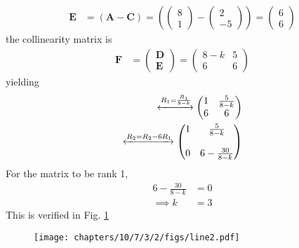 \documentclass[journal,10pt,twocolumn]{article}
\newcommand{\myvec}[1]{\ensuremath{\begin{pmatrix}#1\end{pmatrix}}}
\let\vec\mathbf
\providecommand{\brak}[1]{\ensuremath{\left(#1\right)}}
\let\vec\mathbf
\begin{document}
\begin{enumerate}
\begin{align}
\vec{E} &= \brak{\vec{A}-\vec{C}} = \brak{\myvec{8 \\ 1 } - \myvec{2 \\-5 } } = \myvec{6 \\6}
\end{align}
the collinearity matrix is
\begin{align}
\vec{F} &={\myvec{\vec{D}\\ \vec{E}}}
=
\myvec{
8-k & 5
 \\
6 & 6
}
\end{align}
yielding
\begin{align}
\label{eq:chapters/10/7/3/2/chem_balance_mat_row}
 \xleftrightarrow[]{R_1=\frac{R_1}{8-k}}
\myvec{
1& \frac{5}{8-k}
\\
6 & 6
}
\\
\xleftrightarrow[]{R_2 = R_2-6R_1}
\myvec{
1 & \frac{5}{8-k}
\\
\\
0 & 6-\frac{30}{8-k}
}
\end{align}
For 
the matrix to be rank 1,
\begin{align}
6-\frac{30}{8-k}&=0
\\
\implies k &=3
\end{align}
This is verified in Fig. 
	  \ref{fig:chapters/10/7/3/2/line2.png}
\begin{figure}[H]
	  \centering 
	  \texttt{[image: chapters/10/7/3/2/figs/line2.pdf]}
	  \caption{}
	  \label{fig:chapters/10/7/3/2/line2.png}
	  \end{figure}
\end{enumerate} 
\end{document}
